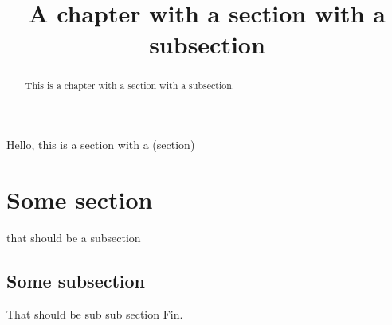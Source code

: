 \documentclass{ximera}
\title{A chapter with a section with a subsection}
\begin{document}
\begin{abstract}
  This is a chapter with a section with a subsection.
\end{abstract}
\maketitle




Hello, this is a section with a (section)

\section{Some section}

that should be a subsection

\subsection{Some subsection}

That should be sub sub section
Fin.
\end{document}
